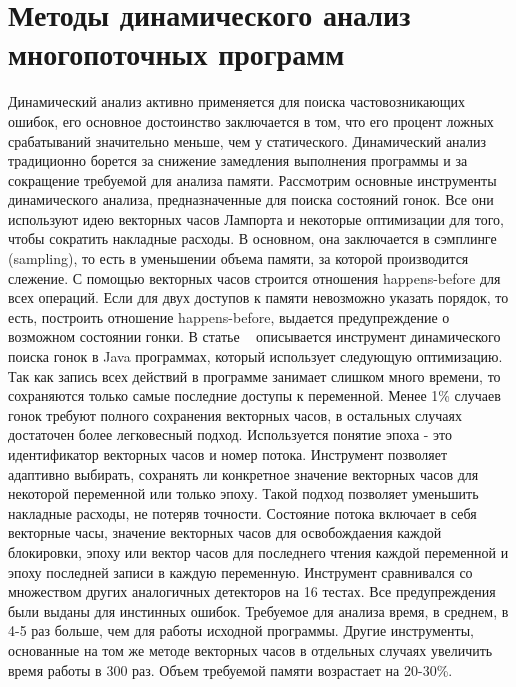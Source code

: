 
\section{Методы динамического анализ многопоточных программ}
\label{rw:dynamic}

Динамический анализ активно применяется для поиска частовозникающих ошибок, его основное достоинство заключается в том, что его процент ложных срабатываний значительно меньше, чем у статического. Динамический анализ традиционно борется за снижение замедления выполнения программы и за сокращение требуемой для анализа памяти. 
Рассмотрим основные инструменты динамического анализа, предназначенные для поиска состояний гонок. Все они используют идею векторных часов Лампорта и некоторые оптимизации для того, чтобы сократить накладные расходы. В основном, она заключается в сэмплинге (sampling), то есть в уменьшении объема памяти, за которой производится слежение. С помощью векторных часов строится отношения happens-before для всех операций. Если для двух доступов к памяти невозможно указать порядок, то есть, построить отношение happens-before, выдается предупреждение о возможном состоянии гонки. 
В статье ~\cite{Flanagan:2009:PLDI, Flanagan:2009} описывается инструмент динамического поиска гонок в Java программах, который использует следующую оптимизацию. Так как запись всех действий в программе занимает слишком много времени, то сохраняются только самые последние доступы к переменной. Менее 1\% случаев гонок требуют полного сохранения векторных часов, в остальных случаях достаточен более легковесный подход. Используется понятие эпоха - это идентификатор векторных часов и номер потока. Инструмент позволяет адаптивно выбирать, сохранять ли конкретное значение векторных часов для некоторой переменной или только эпоху. Такой подход позволяет уменьшить накладные расходы, не потеряв точности.  
Состояние потока включает в себя векторные часы, значение векторных часов для освобождаения каждой блокировки, эпоху или вектор часов для последнего чтения каждой переменной и эпоху последней записи в каждую переменную. 
Инструмент сравнивался со множеством других аналогичных детекторов на 16 тестах. Все предупреждения были выданы для инстинных ошибок. Требуемое для анализа время, в среднем, в 4-5 раз больше, чем для работы исходной программы. Другие инструменты, основанные на том же методе векторных часов в отдельных случаях увеличить время работы в 300 раз. Объем требуемой памяти возрастает на 20-30\%.

